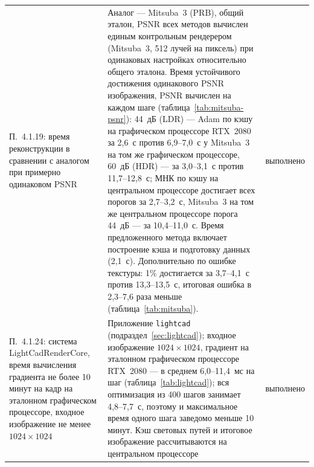 {\begin{xltabular}{\textwidth}{>{\raggedright\arraybackslash}p{0.27\textwidth} >{\raggedright\arraybackslash}X >{\raggedright\arraybackslash}p{0.125\textwidth}}
        П.~4.1.19: время реконструкции в сравнении с аналогом при примерно одинаковом PSNR
            & Аналог --- Mitsuba~3 (PRB), общий эталон, PSNR всех методов вычислен единым контрольным рендерером (Mitsuba~3, 512 лучей на пиксель) при одинаковых настройках относительно общего эталона. Время устойчивого достижения одинакового PSNR изображения, PSNR вычислен на каждом шаге (таблица~\ref{tab:mitsuba-psnr}): 44~дБ (LDR) --- Adam по кэшу на графическом процессоре RTX~2080 за 2,6~с против 6,9--7,0~с у Mitsuba~3 на том же графическом процессоре, 60~дБ (HDR) --- за 3,0--3,1~с против 11,7--12,8~с; МНК по кэшу на центральном процессоре достигает всех порогов за 2,7--3,2~с, Mitsuba~3 на том же центральном процессоре порога 44~дБ --- за 10,4--11,0~с. Время предложенного метода включает построение кэша и подготовку данных (2,1~с). Дополнительно по ошибке текстуры: 1\% достигается за 3,7--4,1~с против 13,3--13,5~с, итоговая ошибка в 2,3--7,6 раза меньше (таблица~\ref{tab:mitsuba}). & выполнено \\
        П.~4.1.24: система LightCadRenderCore, время вычисления градиента не более 10 минут на кадр на эталонном графическом процессоре, входное изображение не менее $1024\times1024$
            & Приложение \texttt{lightcad} (подраздел~\ref{sec:lightcad}); входное изображение $1024\times1024$, градиент на эталонном графическом процессоре RTX~2080 --- в среднем 6,0--11,4~мс на шаг (таблица~\ref{tab:lightcad}); вся оптимизация из 400 шагов занимает 4,8--7,7~с, поэтому и максимальное время одного шага заведомо меньше 10 минут. Кэш световых путей и итоговое изображение рассчитываются на центральном процессоре & выполнено \\
        \end{xltabular}}

\endinput
